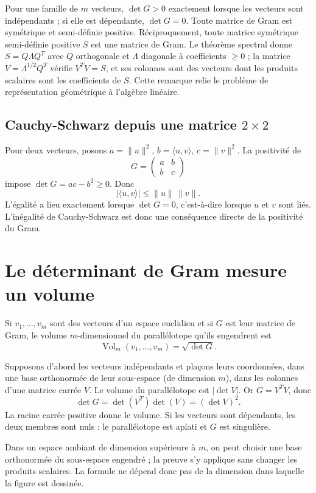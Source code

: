 Pour une famille de $m$ vecteurs, $\det G>0$ exactement lorsque les vecteurs sont indépendants ; si elle est dépendante, $\det G=0$. Toute matrice de Gram est symétrique et semi-définie positive. Réciproquement, toute matrice symétrique semi-définie positive $S$ est une matrice de Gram. Le théorème spectral donne $S=Q\Lambda Q^T$ avec $Q$ orthogonale et $\Lambda$ diagonale à coefficients $\geq0$ ; la matrice $V=\Lambda^{1/2}Q^T$ vérifie $V^TV=S$, et ses colonnes sont des vecteurs dont les produits scalaires sont les coefficients de $S$. Cette remarque relie le problème de représentation géométrique à l'algèbre linéaire.

\subsection{Cauchy-Schwarz depuis une matrice \texorpdfstring{$2\times2$}{2x2}}
Pour deux vecteurs, posons $a=\|u\|^2$, $b=\langle u,v\rangle$, $c=\|v\|^2$. La positivité de
\[
 G=\begin{pmatrix}a&b\\b&c\end{pmatrix}
\]
impose $\det G=ac-b^2\geq0$. Donc
\[
 |\langle u,v\rangle|\leq\|u\|\,\|v\|.
\]
L'égalité a lieu exactement lorsque $\det G=0$, c'est-à-dire lorsque $u$ et $v$ sont liés. L'inégalité de Cauchy-Schwarz est donc une conséquence directe de la positivité du Gram.

\section{Le déterminant de Gram mesure un volume}
\begin{theoreme}
Si $v_1,\ldots,v_m$ sont des vecteurs d'un espace euclidien et si $G$ est leur matrice de Gram, le volume $m$-dimensionnel du parallélotope qu'ils engendrent est
\[
 \boxed{\operatorname{Vol}_m(v_1,\ldots,v_m)=\sqrt{\det G}}.
\]
\end{theoreme}

\demonstration Supposons d'abord les vecteurs indépendants et plaçons leurs coordonnées, dans une base orthonormée de leur sous-espace (de dimension $m$), dans les colonnes d'une matrice carrée $V$. Le volume du parallélotope est $|\det V|$. Or $G=V^TV$, donc
\[
 \det G=\det(V^T)\det(V)=(\det V)^2.
\]
La racine carrée positive donne le volume. Si les vecteurs sont dépendants, les deux membres sont nuls : le parallélotope est aplati et $G$ est singulière.\finpreuve

Dans un espace ambiant de dimension supérieure à $m$, on peut choisir une base orthonormée du sous-espace engendré ; la preuve s'y applique sans changer les produits scalaires. La formule ne dépend donc pas de la dimension dans laquelle la figure est dessinée.

